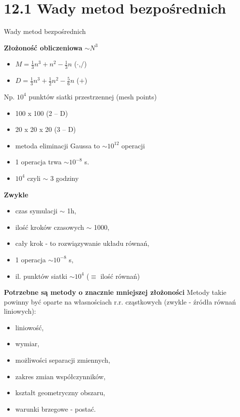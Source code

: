 \section{12.1 Wady metod bezpośrednich}

\begin{frame}{Wady metod bezpośrednich}
  \begin{block}{\textbf{Złożoność obliczeniowa} ${\sim}N^3$}
    \begin{itemize}
      \item{ $M=\frac{1}{3}n^3+n^2-\frac{1}{3}n$ ($\cdot$,$/$)}
      \item{ $D=\frac{1}{3}n^3+\frac{1}{2}n^2-\frac{5}{6}n$ ($+$)}
    \end{itemize}
    Np. $10^4$ punktów siatki przestrzennej (mesh points)
    \begin{itemize}
      \item{100 x 100   (2 -- D)}
      \item{20 x 20 x 20   (3 -- D)}
      \item{metoda eliminacji Gaussa to $\sim 10^{12}$ operacji}
      \item{1 operacja trwa $\sim 10^{-8}$ s.}
      \item{$10^4$ czyli $\sim$ 3 godziny}
    \end{itemize}
  \end{block}
\end{frame}

\begin{frame}{}
  \begin{block}{\textbf{Zwykle}}
    \begin{itemize}
      \item{czas symulacji $\sim$ 1h,}
      \item{ilość kroków czasowych $\sim$ 1000,}
      \item{cały krok - to rozwiązywanie układu równań,}
      \item{1 operacja $\sim 10^{-8}$ s,}
      \item{il. punktów siatki $\sim 10^4$ ($\equiv$ ilość równań)}
    \end{itemize}
  \end{block}
\end{frame}

\begin{frame}{}
  \begin{block}{\textbf{Potrzebne są metody o znacznie mniejszej złożoności}}
    Metody takie powinny być oparte na własnościach r.r. cząstkowych (zwykle - źródła równań liniowych):
    \begin{itemize}
      \item{liniowość,}
      \item{wymiar,}
      \item{możliwości separacji zmiennych,}
      \item{zakres zmian współczynników,}
      \item{kształt geometryczny obszaru,}
      \item{warunki brzegowe - postać.}
    \end{itemize}
  \end{block}
\end{frame}

